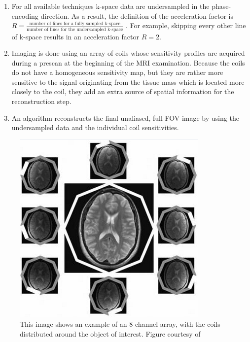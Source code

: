 \begin{enumerate}

    \item For all available techniques k-space data are undersampled in the phase-encoding direction. As a result, the definition of the acceleration factor is $R = \frac{\text{number of lines for a fully sampled k-space}}{\text{number of lines for the undersampled k-space}}$ \cite{Deshmane2012}. For example, skipping every other line of k-space results in an acceleration factor $R = 2$.
    
    \item Imaging is done using an array of coils whose sensitivity profiles are acquired during a prescan at the beginning of the MRI examination. Because the coils do not have a homogeneous sensitivity map, but they are rather more sensitive to the signal originating from the tissue mass which is located more closely to the coil, they add an extra source of spatial information for the reconstruction step.
    
    \item An algorithm reconstructs the final unaliased, full FOV image by using the undersampled data and the individual coil sensitivities.
    
\end{enumerate}

\begin{figure}[ht]
    \centering
    \includegraphics[width=.7\textwidth,keepaspectratio]{coils}
    \caption{This image shows an example of an 8-channel array, with the coils distributed around the object of interest. Figure courtesy of \cite{Deshmane2012}}
    \label{fig:coils}
\end{figure}

